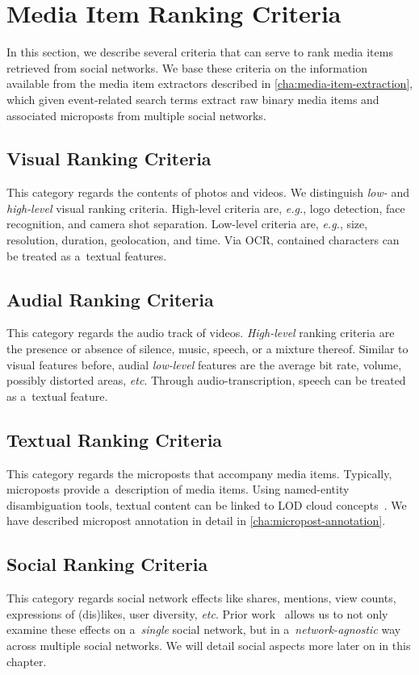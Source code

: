 \section{Media Item Ranking Criteria}
In this section, we describe several criteria that can serve to rank
media items retrieved from social networks. 
We base these criteria on the information available from
the media item extractors described in \autoref{cha:media-item-extraction},
which given event-related search terms
extract raw binary media items and associated microposts
from multiple social networks.

\subsection{Visual Ranking Criteria}
This category regards the contents of photos and videos.
We distinguish \emph{low-} and \emph{high-level} visual ranking criteria.
High-level criteria are, \emph{e.g.}, logo detection,
face recognition, and camera shot separation.
Low-level criteria are, \emph{e.g.}, size, resolution,
duration, geolocation, and time.
Via OCR, contained characters can be treated as a~textual features.

\subsection{Audial Ranking Criteria}
This category regards the audio track of videos.
\emph{High-level} ranking criteria are the presence or absence
of silence, music, speech, or a mixture thereof.
Similar to visual features before,
audial \emph{low-level} features are the average bit rate,
volume, possibly distorted areas, \emph{etc}.
Through audio-transcription, speech can be treated as a~textual feature.

\subsection{Textual Ranking Criteria}
This category regards the microposts that accompany media items.
Typically, microposts provide a~description of media items.
Using named-entity disambiguation tools,
textual content can be linked to LOD cloud concepts~\cite{Facebook2011}.
We have described micropost annotation in detail in \autoref{cha:micropost-annotation}.

\subsection{Social Ranking Criteria}
This category regards social network effects like shares, mentions,
view counts, expressions of (dis)likes, user diversity, \emph{etc}.
Prior work~\cite{khrouf2012aggregatingsocialmedia}
allows us to not only examine these effects
on a~\emph{single} social network,
but in a~\emph{network-agnostic} way across multiple social networks.
We will detail social aspects more later on in this chapter.


